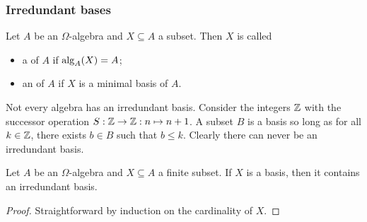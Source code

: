 \subsubsection{Irredundant bases}
\begin{definition}
Let $A$ be an $\Omega$-algebra and $X\subseteq A$ a subset. Then $X$ is called
\begin{itemize}
\item a  of $A$ if $\operatorname{alg}_A(X) = A$;
\item an  of $A$ if $X$ is a minimal basis of $A$.
\end{itemize}
\end{definition}

\begin{example}
Not every algebra has an irredundant basis. Consider the integers $\mathbb{Z}$ with the successor operation $S: \mathbb{Z}\to \mathbb{Z}: n\mapsto n+1$. A subset $B$ is a basis so long as for all $k\in \mathbb{Z}$, there exists $b\in B$ such that $b\leq k$. Clearly there can never be an irredundant basis.
\end{example}

\begin{lemma} \label{basisContainsIrredundantBasis}
Let $A$ be an $\Omega$-algebra and $X\subseteq A$ a finite subset. If $X$ is a basis, then it contains an irredundant basis.
\end{lemma}
\begin{proof}
Straightforward by induction on the cardinality of $X$.
\end{proof}

